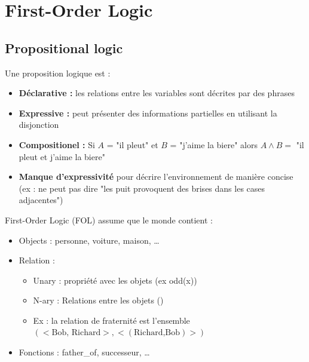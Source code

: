 \section{First-Order Logic}
	\subsection{Propositional logic}
		Une proposition logique est :
		\begin{itemize}
			\item \textbf{Déclarative :} les relations entre les variables sont décrites par des phrases
			\item \textbf{Expressive :} peut présenter des informations partielles en utilisant la disjonction
			\item \textbf{Compositionel :} Si $A$ = "il pleut" et $B$ = "j'aime la biere" alors $A \wedge B =$ "il pleut et j'aime la biere"
			\item \textbf{Manque d'expressivité} pour décrire l'environnement de manière concise (ex : ne peut pas dire "les puit provoquent des brises dans les cases adjacentes")
		\end{itemize}
		
		First-Order Logic (FOL) assume que le monde contient :
		\begin{itemize}
			\item Objects : personne, voiture, maison, \dots
			\item Relation : 
			\begin{itemize}
				\item Unary : propriété avec les objets (ex odd(x))
				\item N-ary : Relations entre les objets ()
				\item Ex : la relation de fraternité est l'ensemble $(<\text{Bob, Richard}>,<(\text{Richard,Bob})>)$
			\end{itemize}
			\item Fonctions : father\_of, successeur, \dots
		\end{itemize}
